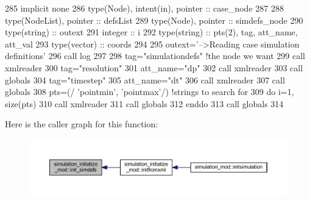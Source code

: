 \begin{DoxyCode}
285     \textcolor{keywordtype}{implicit none}
286     \textcolor{keywordtype}{type}(Node), \textcolor{keywordtype}{intent(in)}, \textcolor{keywordtype}{pointer} :: case\_node
287 
288     \textcolor{keywordtype}{type}(NodeList), \textcolor{keywordtype}{pointer} :: defsList
289     \textcolor{keywordtype}{type}(Node), \textcolor{keywordtype}{pointer} :: simdefs\_node
290     \textcolor{keywordtype}{type}(string) :: outext
291     \textcolor{keywordtype}{integer} :: i
292     \textcolor{keywordtype}{type}(string) :: pts(2), tag, att\_name, att\_val
293     \textcolor{keywordtype}{type}(vector) :: coords
294 
295     outext=\textcolor{stringliteral}{'-->Reading case simulation definitions'}
296     \textcolor{keyword}{call }log%
297 
298     tag=\textcolor{stringliteral}{"simulationdefs"}    \textcolor{comment}{!the node we want}
299     \textcolor{keyword}{call }xmlreader%
300     tag=\textcolor{stringliteral}{"resolution"}
301     att\_name=\textcolor{stringliteral}{"dp"}
302     \textcolor{keyword}{call }xmlreader%
303     \textcolor{keyword}{call }globals%
304     tag=\textcolor{stringliteral}{"timestep"}
305     att\_name=\textcolor{stringliteral}{"dt"}
306     \textcolor{keyword}{call }xmlreader%
307     \textcolor{keyword}{call }globals%
308     pts=(/ \textcolor{stringliteral}{'pointmin'}, \textcolor{stringliteral}{'pointmax'}/) \textcolor{comment}{!strings to search for}
309     \textcolor{keywordflow}{do} i=1, \textcolor{keyword}{size}(pts)
310         \textcolor{keyword}{call }xmlreader%
311         \textcolor{keyword}{call }globals%
312 \textcolor{keywordflow}{    enddo}
313     \textcolor{keyword}{call }globals%
314 
\end{DoxyCode}
Here is the caller graph for this function\+:
\nopagebreak
\begin{figure}[H]
\begin{center}
\leavevmode
\includegraphics[width=350pt]{namespacesimulation__initialize__mod_ae4a495136e5f02724a5cc456d5884281_icgraph}
\end{center}
\end{figure}
\mbox{\label{namespacesimulation__initialize__mod_ae89df4e3074d9624a7db2bc015545d8d}} 
